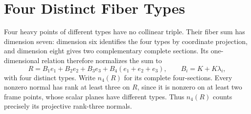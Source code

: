 \documentclass[12pt,letterpaper,onecolumn]{article}
\theoremstyle{definition}
\theoremstyle{remark}
\begin{document}
\section{Four Distinct Fiber Types}
Four heavy points of different types have no collinear triple. Their fiber sum has dimension seven: dimension six identifies the four types by coordinate projection, and dimension eight gives two complementary complete sections.
Its one-dimensional relation therefore normalizes the sum to
\[
R=B_1e_1+B_2e_2+B_3e_3+B_4(e_1+e_2+e_3),
\qquad B_i=K+K\lambda_i,
\]
with four distinct types. Write \(n_4(R)\) for its complete four-sections.
Every nonzero normal has rank at least three on \(R\), since it is nonzero on at least two frame points, whose scalar planes have different types.
Thus \(n_4(R)\) counts precisely its projective rank-three normals.
\end{document}
